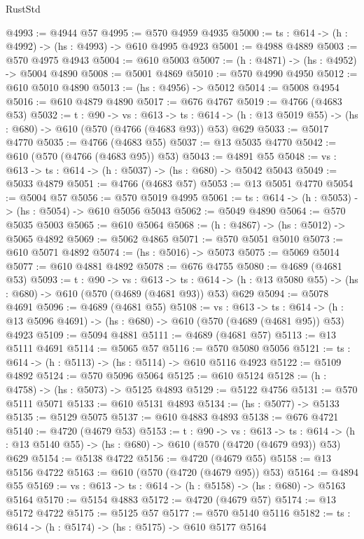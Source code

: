 \begin{lexlean}{RustStd}
\begin{coremodule}
@4993 := @4944 @57
@4995 := @570 @4959 @4935
@5000 := {ts : @614} -> (h : @4992) -> (hs : @4993) -> @610 @4995 @4923
@5001 := @4988 @4889
@5003 := @570 @4975 @4943
@5004 := @610 @5003
@5007 := (h : @4871) -> (hs : @4952) -> @5004 @4890
@5008 := @5001 @4869
@5010 := @570 @4990 @4950
@5012 := @610 @5010 @4890
@5013 := (hs : @4956) -> @5012
@5014 := @5008 @4954
@5016 := @610 @4879 @4890
@5017 := @676 @4767
@5019 := @4766 (@4683 @53)
@5032 := {t : @90} ->
  {vs : @613} ->
  {ts : @614} -> (h : @13 @5019 @55) -> (hs : @680) -> @610 (@570 (@4766 (@4683 @93)) @53) @629
@5033 := @5017 @4770
@5035 := @4766 (@4683 @55)
@5037 := @13 @5035 @4770
@5042 := @610 (@570 (@4766 (@4683 @95)) @53)
@5043 := @4891 @55
@5048 := {vs : @613} -> {ts : @614} -> (h : @5037) -> (hs : @680) -> @5042 @5043
@5049 := @5033 @4879
@5051 := @4766 (@4683 @57)
@5053 := @13 @5051 @4770
@5054 := @5004 @57
@5056 := @570 @5019 @4995
@5061 := {ts : @614} -> (h : @5053) -> (hs : @5054) -> @610 @5056 @5043
@5062 := @5049 @4890
@5064 := @570 @5035 @5003
@5065 := @610 @5064
@5068 := (h : @4867) -> (hs : @5012) -> @5065 @4892
@5069 := @5062 @4865
@5071 := @570 @5051 @5010
@5073 := @610 @5071 @4892
@5074 := (hs : @5016) -> @5073
@5075 := @5069 @5014
@5077 := @610 @4881 @4892
@5078 := @676 @4755
@5080 := @4689 (@4681 @53)
@5093 := {t : @90} ->
  {vs : @613} ->
  {ts : @614} -> (h : @13 @5080 @55) -> (hs : @680) -> @610 (@570 (@4689 (@4681 @93)) @53) @629
@5094 := @5078 @4691
@5096 := @4689 (@4681 @55)
@5108 := {vs : @613} ->
  {ts : @614} -> (h : @13 @5096 @4691) -> (hs : @680) -> @610 (@570 (@4689 (@4681 @95)) @53) @4923
@5109 := @5094 @4881
@5111 := @4689 (@4681 @57)
@5113 := @13 @5111 @4691
@5114 := @5065 @57
@5116 := @570 @5080 @5056
@5121 := {ts : @614} -> (h : @5113) -> (hs : @5114) -> @610 @5116 @4923
@5122 := @5109 @4892
@5124 := @570 @5096 @5064
@5125 := @610 @5124
@5128 := (h : @4758) -> (hs : @5073) -> @5125 @4893
@5129 := @5122 @4756
@5131 := @570 @5111 @5071
@5133 := @610 @5131 @4893
@5134 := (hs : @5077) -> @5133
@5135 := @5129 @5075
@5137 := @610 @4883 @4893
@5138 := @676 @4721
@5140 := @4720 (@4679 @53)
@5153 := {t : @90} ->
  {vs : @613} ->
  {ts : @614} -> (h : @13 @5140 @55) -> (hs : @680) -> @610 (@570 (@4720 (@4679 @93)) @53) @629
@5154 := @5138 @4722
@5156 := @4720 (@4679 @55)
@5158 := @13 @5156 @4722
@5163 := @610 (@570 (@4720 (@4679 @95)) @53)
@5164 := @4894 @55
@5169 := {vs : @613} -> {ts : @614} -> (h : @5158) -> (hs : @680) -> @5163 @5164
@5170 := @5154 @4883
@5172 := @4720 (@4679 @57)
@5174 := @13 @5172 @4722
@5175 := @5125 @57
@5177 := @570 @5140 @5116
@5182 := {ts : @614} -> (h : @5174) -> (hs : @5175) -> @610 @5177 @5164

\end{coremodule}
\end{lexlean}
